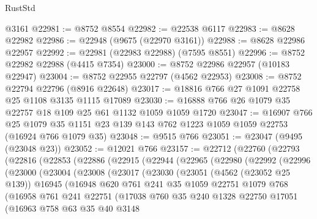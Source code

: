 \begin{lexlean}{RustStd}
\begin{coremodule}
    @3161
@22981 := @8752 @8554
@22982 := @22538 @6117
@22983 := @8628 @22982
@22986 := @22948 (@9675 (@22970 @3161))
@22988 := @8628 @22986 @22957
@22992 := @22981 (@22983 @22988) (@7595 @8551)
@22996 := @8752 @22982 @22988 (@4415 @7354)
@23000 := @8752 @22986 @22957 (@10183 @22947)
@23004 := @8752 @22955 @22797 (@4562 @22953)
@23008 := @8752 @22794 @22796 (@8916 @22648)
@23017 := @18816 @766 @27 @1091 @22758 @25 @1108 @3135 @1115 @17089
@23030 := @16888 @766 @26 @1079 @35 @22757 @18 @109 @25 @61 @1132 @1059 @1059 @1720
@23047 := @16907
    @766
    @25
    @1079
    @35
    @1151
    @23
    @139
    @143
    @762
    @1223
    @1059
    @1059
    @22753
    (@16924 @766 @1079 @35)
@23048 := @9515 @766
@23051 := @23047 (@9495 (@23048 @23))
@23052 := @12021 @766
@23157 := @22712
    (@22760
      (@22793
        (@22816
          (@22853
            (@22886
              (@22915
                (@22944
                  (@22965
                    (@22980
                      (@22992
                        (@22996
                          (@23000
                            (@23004
                              (@23008
                                (@23017
                                  (@23030
                                    (@23051
                                      (@4562 (@23052 @25 @139))
                                      @16945
                                      (@16948
                                        @620
                                        @761
                                        @241
                                        @35
                                        @1059
                                        @22751
                                        @1079
                                        @768
                                        (@16958
                                          @761
                                          @241
                                          @22751
                                          (@17038
                                            @760
                                            @35
                                            @240
                                            @1328
                                            @22750
                                            @17051
                                            (@16963
                                              @758
                                              @63
                                              @35
                                              @40
                                              @3148

\end{coremodule}
\end{lexlean}
